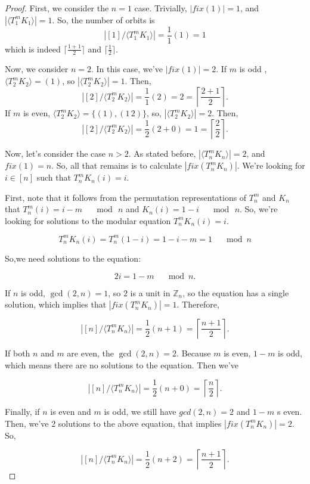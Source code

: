 \documentclass[12pt]{article}
\begin{document}
\begin{proof}
First, we consider the $n = 1$ case. Trivially, $|fix(1)| = 1$, and $|\langle T_1^m K_1 \rangle| = 1$. So, the number of orbits is $$\left|[1]/\langle T_1^m K_1 \rangle \right|= \frac{1}{1}(1) = 1$$ which is indeed $\lceil \frac{1 + 1}{2} \rceil$ and $\lceil \frac{1}{2}\rceil$. 

Now, we consider $n = 2$. In this case, we've $|fix(1)| = 2$. If $m$ is odd , $\langle T_2^m K_2 \rangle = (1)$, so $|\langle T_2^m K_2 \rangle| = 1$. Then, $$|[2]/\langle T_2^m K_2 \rangle| = \frac{1}{1}(2) = 2 = \left\lceil \frac{2 + 1}{2}\right\rceil.$$ If $m$ is even, $\langle T_2^m K_2 \rangle = \{(1), (1 \, 2) \}$, so, $|\langle T_2^m K_2 \rangle| = 2$. Then, $$|[2]/\langle T_2^m K_2 \rangle| = \frac{1}{2}(2 + 0) = 1 = \left\lceil \frac{2}{2}\right\rceil.$$

Now, let's consider the case $n>2$. As stated before, $|\langle T_n^m K_n \rangle| = 2$, and $fix(1) = n$. So, all that remains is to calculate $|fix(T_n^m K_n)|$. We're looking for $i \in [n]$ such that $T_n^m K_n(i) = i$.

First, note that it follows from the permutation representations of $T_n^m$ and $K_n$ that $T_n^m(i) = i - m \quad \mod \, n$ and $K_n(i) = 1 - i \quad \mod \, n$. So, we're looking for solutions to the modular equation $T_n^m K_n(i) = i$.

$$
T_n^m K_n(i) = T_n^m(1 - i) = 1 - i - m = 1 \quad \mod n
$$

So,we need solutions to the equation:

\begin{equation}
2i = 1 - m \quad \mod n.
\end{equation}

If $n$ is odd, $\gcd(2, n) = 1$, so $2$ is a unit in $\mathds{Z}_n$, so the equation has a single solution, which implies that $|fix(T_n^m K_n)|=1$. Therefore, 

$$
\left| [n]/\langle T_n^m K_n \rangle \right| = \frac{1}{2}(n + 1) = \left \lceil \frac{n + 1}{2} \right \rceil.
$$

If both $n$ and $m$ are even, the $\gcd(2, n) = 2$. Because $m$ is even, $1-m$ is odd, which means there are no solutions to the equation. Then we've 

$$
\left| [n]/\langle T_n^m K_n \rangle \right| = \frac{1}{2}(n + 0) = \left \lceil \frac{n}{2} \right \rceil.
$$

Finally, if $n$ is even and $m$ is odd, we still have $gcd(2, n) = 2$ and $1-m$ s even. Then, we've $2$ solutions to the above equation, that implies $|fix(T_n^m K_n)| = 2$. So, 

$$
\left| [n]/\langle T_n^m K_n \rangle \right| = \frac{1}{2}(n + 2) = \left \lceil \frac{n + 1}{2} \right \rceil.
$$
\end{proof}
\end{document}
